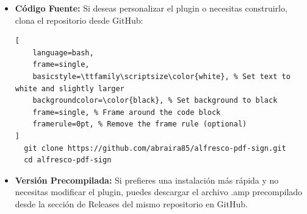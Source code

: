 \documentclass{ol-softwaremanual}
\begin{document}
\begin{itemize}
	\item \textbf{Código Fuente:} Si deseas personalizar el plugin o necesitas construirlo, clona el repositorio desde GitHub:
\begin{lstlisting}[
	language=bash,
	frame=single,
	basicstyle=\ttfamily\scriptsize\color{white}, % Set text to white and slightly larger
	backgroundcolor=\color{black}, % Set background to black
	frame=single, % Frame around the code block
	framerule=0pt, % Remove the frame rule (optional)
]
  git clone https://github.com/abraira85/alfresco-pdf-sign.git
  cd alfresco-pdf-sign
\end{lstlisting}
	\item \textbf{Versión Precompilada:} Si prefieres una instalación más rápida y no necesitas modificar el plugin, puedes descargar el archivo .amp precompilado desde la sección de Releases del mismo repositorio en GitHub.
\end{itemize}
\end{document}
